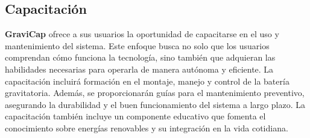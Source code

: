             \subsection{Capacitación}
                \textcolor{dark_violet}{\textbf{GraviCap}} ofrece a sus usuarios la oportunidad de capacitarse en el uso y mantenimiento del sistema. Este enfoque busca no solo que los usuarios comprendan cómo funciona la tecnología, sino también que adquieran las habilidades necesarias para operarla de manera autónoma y eficiente. La capacitación incluirá formación en el montaje, manejo y control de la batería gravitatoria. Además, se proporcionarán guías para el mantenimiento preventivo, asegurando la durabilidad y el buen funcionamiento del sistema a largo plazo. La capacitación también incluye un componente educativo que fomenta el conocimiento sobre energías renovables y su integración en la vida cotidiana.\par